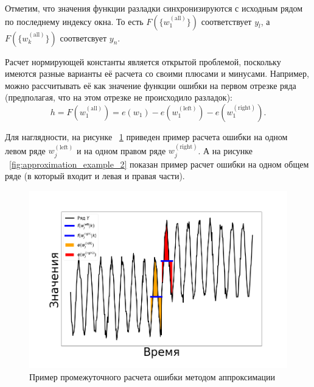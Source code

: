 \documentclass[%
12pt,
master,  %
natbib,      %
subf,        %
substylefile = spbu.rtx,
href,        %
colorlinks,  %
]{disser}
\begin{document}
Отметим, что значения функции разладки синхронизируются с исходным рядом по последнему индексу окна. То есть $F(\{w_1^{\mathrm{(all)}} \}) $ соответствует $y_l$, а $F(\{w_k^{\mathrm{(all)}} \}) $ соответсвует $y_n$.

Расчет нормирующей константы является открытой проблемой, поскольку имеются разные варианты её расчета со своими плюсами и минусами.
Например, можно рассчитывать её как значение функции ошибки на первом отрезке ряда (предполагая, что на этом отрезке не происходило разладок):
\begin{equation*} 
h = F(w_1^{\mathrm{(all)}}) = e(w_1) - e(w_1^{\mathrm{(left)}}) - e(w_1^{\mathrm{(right)}}). 
\end{equation*}

Для наглядности, на рисунке ~\ref{fig:approximation_example_1} приведен пример расчета ошибки на одном левом ряде $ w_j^{\mathrm{(left)}} $ и на одном правом ряде $ w_j^{\mathrm{(right)}} $. А на рисунке ~\ref{fig:approximation_example_2} показан пример расчет ошибки на одном общем ряде (в который входит и левая и правая части).


\begin{figure}[!hhh]
	\begin{center}
		\includegraphics[width=12cm]{approaches_second_2_ru}
	\end{center}
	\vspace{-5mm}\caption{Пример промежуточного расчета ошибки методом аппроксимации}
	\label{fig:approximation_example_1}
\end{figure}
\end{document}
